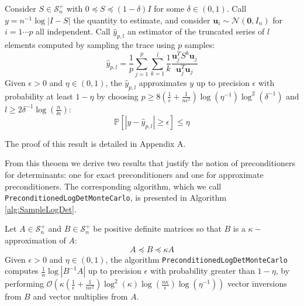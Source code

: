 \begin{theorem} \label{thm:det-sampling-theorem}Consider $S\in\mathcal{S}_{n}^{+}$
with $0\preceq S\preceq\left(1-\delta\right)I$ for some $\delta\in\left(0,1\right)$.
Call $y=n^{-1}\log\left|I-S\right|$ the quantity to estimate, and
consider $\mathbf{u}_{i}\sim\mathcal{N}\left(\mathbf{0},I_{n}\right)$
for $i=1\cdots p$ all independent. Call $\hat{y}_{p,l}$ an estimator
of the truncated series of $l$ elements computed by sampling the
trace using $p$ samples: 
\[
\hat{y}_{p,l}=\frac{1}{p}\sum_{j=1}^{p}\sum_{k=1}^{l}\frac{1}{k}\frac{\mathbf{u}_{j}^{T}S^{k}\mathbf{u}_{j}}{\mathbf{u}_{j}^{T}\mathbf{u}_{j}}
\]
Given $\epsilon>0$ and $\eta\in\left(0,1\right)$, the $\hat{y}_{p,l}$
approximates $y$ up to precision $\epsilon$ with probability at
least $1-\eta$ by choosing $p\geq8\left(\frac{1}{\epsilon}+\frac{1}{n\epsilon^{2}}\right)\log\left(\eta^{-1}\right)\log^{2}\left(\delta^{-1}\right)$
and $l\geq2\delta^{-1}\log\left(\frac{n}{\delta\epsilon}\right)$:
\[
\mathbb{P}\left[\left|y-\hat{y}_{p,l}\right|\geq\epsilon\right]\leq\eta
\]
\end{theorem}

The proof of this result is detailed in Appendix A.

From this theoem we derive two results that justify the notion of
preconditioners for determinants: one for exact preconditioners and
one for approximate preconditioners. The corresponding algorithm,
which we call \texttt{PreconditionedLogDetMonteCarlo}, is presented
in Algorithm \ref{alg:SampleLogDet}.

\begin{corollary} \label{cor:preconditioning}Let $A\in\mathcal{S}_{n}^{+}$
and $B\in\mathcal{S}_{n}^{+}$ be positive definite matrices so that
$B$ is a $\kappa-$approximation of $A$: 
\begin{equation}
A\preceq B\preceq\kappa A\label{eq:A-B-bounds}
\end{equation}
Given $\epsilon>0$ and $\eta\in\left(0,1\right)$, the algorithm
\texttt{PreconditionedLogDetMonteCarlo} computes $\frac{1}{n}\log\left|B^{-1}A\right|$
up to precision $\epsilon$ with probability greater than $1-\eta$,
by performing $\mathcal{O}\left(\kappa\left(\frac{1}{\epsilon}+\frac{1}{n\epsilon^{2}}\right)\log^{2}\left(\kappa\right)\log\left(\frac{n\kappa}{\epsilon}\right)\log\left(\eta^{-1}\right)\right)$
vector inversions from $B$ and vector multiplies from $A$.

\end{corollary}

